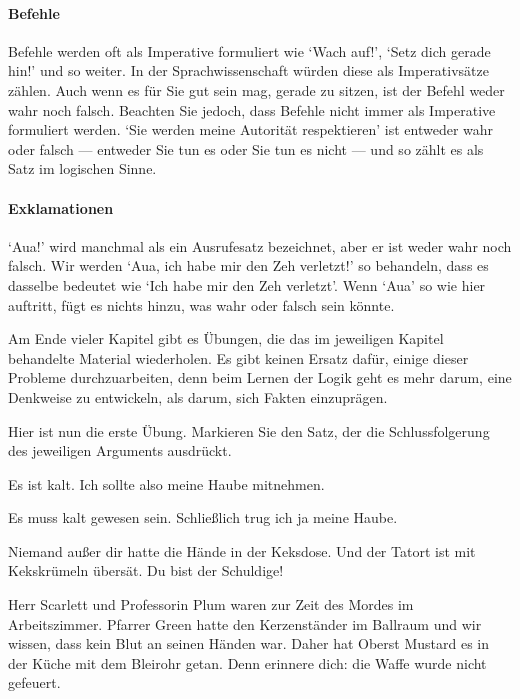 \paragraph{Befehle} Befehle werden oft als Imperative formuliert wie `Wach auf!', `Setz dich gerade hin!' und so weiter. In der Sprachwissenschaft würden diese als Imperativsätze zählen. Auch wenn es für Sie gut sein mag, gerade zu sitzen, ist der Befehl weder wahr noch falsch. Beachten Sie jedoch, dass Befehle nicht immer als Imperative formuliert werden. `Sie werden meine Autorität respektieren' ist entweder wahr oder falsch --- entweder Sie tun es oder Sie tun es nicht --- und so zählt es als Satz im logischen Sinne.

\paragraph{Exklamationen} `Aua!' wird manchmal als ein Ausrufesatz bezeichnet, aber er ist weder wahr noch falsch. Wir werden `Aua, ich habe mir den Zeh verletzt!' so behandeln, dass es dasselbe bedeutet wie `Ich habe mir den Zeh verletzt'. Wenn `Aua' so wie hier auftritt, fügt es nichts hinzu, was wahr oder falsch sein könnte.


\practiceproblems
Am Ende vieler Kapitel gibt es Übungen, die das im jeweiligen Kapitel behandelte Material wiederholen. Es gibt keinen Ersatz dafür, einige dieser Probleme durchzuarbeiten, denn beim Lernen der Logik geht es mehr darum, eine Denkweise zu entwickeln, als darum, sich Fakten einzuprägen.

\medskip

Hier ist nun die erste Übung. Markieren Sie den Satz, der die Schlussfolgerung des jeweiligen Arguments ausdrückt.
\begin{earg}
	\item Es ist kalt. Ich sollte also meine Haube mitnehmen.
	\item Es muss kalt gewesen sein. Schlie{\ss}lich trug ich ja meine Haube.
	\item Niemand au{\ss}er dir hatte die Hände in der Keksdose. Und der Tatort ist mit Kekskrümeln übersät. Du bist der Schuldige!
	\item Herr Scarlett und Professorin Plum waren zur Zeit des Mordes im Arbeitszimmer. Pfarrer Green hatte den Kerzenständer im Ballraum und wir wissen, dass kein Blut an seinen Händen war. Daher hat Oberst Mustard es in der Küche mit dem Bleirohr getan. Denn erinnere dich: die Waffe wurde nicht gefeuert.
\end{earg}


